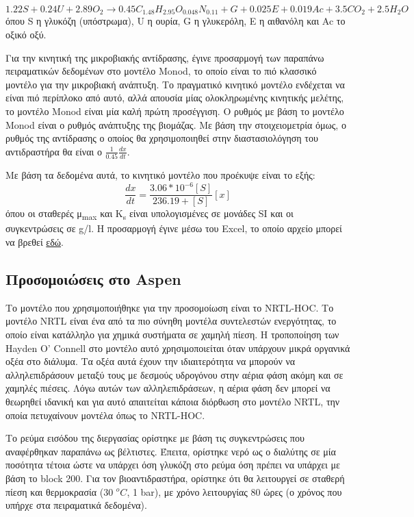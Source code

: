 \documentclass[11pt]{article}
\begin{document}
\[ 1.22 S + 0.24U + 2.89 O_2 \rightarrow 0.45 C_{1.48}H_{2.95}O_{0.048}N_{0.11} + G + 0.025E + 0.019Ac + 3.5CO_2 + 2.5H_2O \]
όπου S η γλυκόζη (υπόστρωμα), U η ουρία, G η γλυκερόλη, Ε η αιθανόλη και Ac το οξικό οξύ.

Για την κινητική της μικροβιακής αντίδρασης, έγινε προσαρμογή των παραπάνω πειραματικών δεδομένων στο μοντέλο Monod, το οποίο είναι το πιό κλασσικό μοντέλο για την μικροβιακή ανάπτυξη. Το πραγματικό κινητικό μοντέλο ενδέχεται να είναι πιό περίπλοκο από αυτό, αλλά απουσία μίας ολοκληρωμένης κινητικής μελέτης, το μοντέλο Monod είναι μία καλή πρώτη προσέγγιση. Ο ρυθμός με βάση το μοντέλο Monod είναι ο ρυθμός ανάπτυξης της βιομάζας. Με βάση την στοιχειομετρία όμως, ο ρυθμός της αντίδρασης ο οποίος θα χρησιμοποιηθεί στην διαστασιολόγηση του αντιδραστήρα θα είναι ο \(\frac{1}{0.45} \frac{dx}{dt}\).

Με βάση τα δεδομένα αυτά, το κινητικό μοντέλο που προέκυψε είναι το εξής:
\[ \frac{dx}{dt} = \frac{3.06*10^{-6}[S]}{236.19+[S]}[x] \] όπου οι σταθερές μ\textsubscript{max} και K\textsubscript{s} είναι υπολογισμένες σε μονάδες SI και οι συγκεντρώσεις σε g/l. Η προσαρμογή έγινε μέσω του Excel, το οποίο αρχείο μπορεί να βρεθεί \href{https://github.com/Vidianos-Giannitsis/Process-Design/blob/master/Calculations/c\_glycerinogenes\_kinetics.ods}{εδώ}.

\subsection{Προσομοιώσεις στο Aspen}
\label{sec:org3707013}
Το μοντέλο που χρησιμοποιήθηκε για την προσομοίωση είναι το NRTL-HOC. Το μοντέλο NRTL είναι ένα από τα πιο σύνηθη μοντέλα συντελεστών ενεργότητας, το οποίο είναι κατάλληλο για χημικά συστήματα σε χαμηλή πίεση. Η τροποποίηση των Hayden O' Connell στο μοντέλο αυτό χρησιμοποιείται όταν υπάρχουν μικρά οργανικά οξέα στο διάλυμα. Τα οξέα αυτά έχουν την ιδιαιτερότητα να μπορούν να αλληλεπιδράσουν μεταξύ τους με δεσμούς υδρογόνου στην αέρια φάση ακόμη και σε χαμηλές πιέσεις. Λόγω αυτών των αλληλεπιδράσεων, η αέρια φάση δεν μπορεί να θεωρηθεί ιδανική και για αυτό απαιτείται κάποια διόρθωση στο μοντέλο NRTL, την οποία πετυχαίνουν μοντέλα όπως το NRTL-HOC.

Το ρεύμα εισόδου της διεργασίας ορίστηκε με βάση τις συγκεντρώσεις που αναφέρθηκαν παραπάνω ως βέλτιστες. Έπειτα, ορίστηκε νερό ως ο διαλύτης σε μία ποσότητα τέτοια ώστε να υπάρχει όση γλυκόζη στο ρεύμα όση πρέπει να υπάρχει με βάση το block 200. Για τον βιοαντιδραστήρα, ορίστηκε ότι θα λειτουργεί σε σταθερή πίεση και θερμοκρασία (30 \(^oC\), 1 bar), με χρόνο λειτουργίας 80 ώρες (ο χρόνος που υπήρχε στα πειραματικά δεδομένα).
\end{document}
